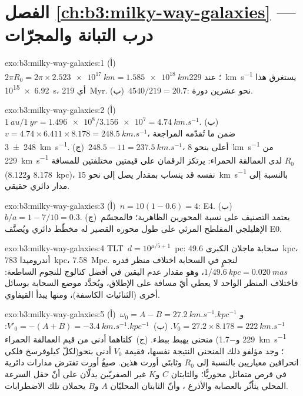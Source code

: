 \section*{الفصل \ref{ch:b3:milky-way-galaxies} --- درب التبانة والمجرّات}

\begin{solution}{exo:b3:milky-way-galaxies:1}
(أ)~$2\pi R_0 = 2\pi\times\qty{2.523e17}{km} = \qty{1.585e18}{km}$؛ عند
\qty{229}{km.s^{-1}} يستغرق هذا \qty{6.92e15}{s}، أي
\qty{219}{Myr}. (ب)~$4540/219 = 20.7$: نحو عشرين دورة.
\end{solution}

\begin{solution}{exo:b3:milky-way-galaxies:2}
(أ)~$\qty{1}{au}/\qty{1}{yr} = \num{1.496e8}/\num{3.156e7} =
\qty{4.74}{km.s^{-1}}$. (ب)~$v = 4.74\times6.411\times8.178 =
\qty{248.5}{km.s^{-1}}$، ضمن ما تُقدّمه المراجعة
\qty[separate-uncertainty=true]{248 \pm 3}{km.s^{-1}}. (ج)~$248.5 - 11 = \qty{237.5}{km.s^{-1}}$،
أعلى بنحو \qty{8}{km.s^{-1}} من \qty{229}{km.s^{-1}} لدى العمالقة الحمراء:
يرتكز الرقمان على قيمتين مختلفتين للمسافة $R_0$ (8.178 و\qty{8.122}{kpc})،
 نفسه قد ينساب بمقدار يصل إلى نحو \qty{15}{km.s^{-1}} بالنسبة
إلى مدار دائري حقيقي.
\end{solution}

\begin{solution}{exo:b3:milky-way-galaxies:3}
(أ)~$n = 10(1 - 0.6) = 4$: E4. (ب)~$b/a = 1 - 7/10 = 0.3$. (ج)~يعتمد التصنيف على
نسبة المحورين الظاهرية؛ فالمجسّم الإهليلجي المفلطح المرئي على طول محوره القصير
له مخطّط دائري ويُصنَّف E0.
\end{solution}

\begin{solution}{exo:b3:milky-way-galaxies:4}
\mbox{\textdir TLT $d = 10^{\mu/5 + 1}$~pc}: سحابة ماجلان الكبرى \qty{49.6}{kpc}، أندروميدا
\qty{783}{kpc}،  \qty{7.58}{Mpc}. لنجمٍ في السحابة
اختلاف منظر قدره $1/\qty{49.6}{kpc} = \qty{0.020}{mas}$، وهو
مقدار عدم اليقين في أفضل كتالوج للنجوم الساطعة: فاختلاف المنظر الواحد لا يعطي
أيّ مسافة على الإطلاق، ويُحدَّد موضع السحابة بوسائل أخرى (الثنائيات الكاسفة)،
ومنها يبدأ  القيفاوي.
\end{solution}

\begin{solution}{exo:b3:milky-way-galaxies:5}
(أ)~$\omega_0 = A - B = \qty{27.2}{km.s^{-1}.kpc^{-1}}$ و$V_0 =
27.2\times8.178 = \qty{222}{km.s^{-1}}$. (ب)~$V'_0 = -(A + B) =
\qty{-3.4}{km.s^{-1}.kpc^{-1}}$: منحنى يهبط ببطء. (ج)~كلتاهما
أدنى من قيم العمالقة الحمراء (229 و\qty{-1.7}{km.s^{-1}} لكلّ
كيلوفرسخ فلكي)؛ وجد مؤلفو ذلك المنحنى النتيجة نفسها، فقيمة $V_0$ أدنى بنحو
انحرافين معياريين بالنسبة إلى $R_0$ وثابتَي أورت هذين. صيغُ أورت
تفترض مدارات دائرية في قرص متماثل محوريًّا؛ والثابتان $C$ و$K$ غير الصفريّين
يدلّان على أنّ حقل السرعة المحلي يتأثّر بالعصابة والأذرع ، وأنّ
الثابتان المحليّان $A$ و$B$ يحملان تلك الاضطرابات.
\end{solution}

